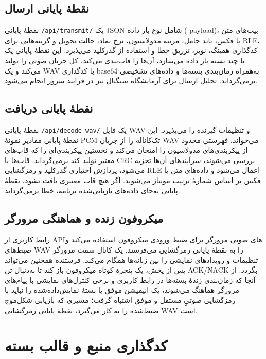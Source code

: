 \documentclass[12pt,a4paper]{article}
\providecommand{\lr}[1]{\foreignlanguage{english}{\begingroup\hyphenchar\font=-1 #1\endgroup}}
\newcommand{\code}[1]{\lr{\texttt{#1}}}
\begin{document}
\subsection{نقطۀ پایانی ارسال}
نقطۀ پایانی \code{/api/transmit/} یک \lr{JSON} شامل نوع بار داده (\lr{payload})، بیت‌های متن یا فکس، باند حامل، مرتبۀ مدولاسیون، نرخ نماد، حالت تحویل و گزینه‌هایی برای \lr{RLE}، کدگذاری همینگ، نویز، تزریق خطا و استفاده از گذرکلید می‌پذیرد. این نقطۀ پایانی یک یا چند بستۀ بار داده می‌سازد، آن‌ها را قاب‌بندی می‌کند، کل جریان صوتی را تولید می‌کند و یک \lr{WAV} با کدگذاری \lr{base64} به‌همراه زمان‌بندی بسته‌ها و داده‌های تشخیصی برمی‌گرداند. تحلیل ارسال برای آزمایشگاه سیگنال نیز در فرایند سرور انجام می‌شود.

\subsection{نقطۀ پایانی دریافت}
نقطۀ پایانی \code{/api/decode-wav/} یک فایل \lr{WAV} و تنظیمات گیرنده را می‌پذیرد. این نقطۀ پایانی مقادیر نمونۀ \lr{PCM} تک‌کاناله را از جریان \lr{WAV} می‌خواند، فهرستی محدود از پیکربندی‌های مدولاسیون را امتحان می‌کند و نخستین پیکربندی‌ای را که قاب‌های معتبر تولید کند برمی‌گرداند. قاب‌ها با \lr{CRC} بررسی می‌شوند، سرآیندهای آن‌ها تجزیه می‌شود، پردازش اختیاری گذرکلید و رمزگشایی \lr{RLE} اعمال می‌شود و داده‌های متن یا فکس بر اساس شمارۀ ترتیب مونتاژ می‌شوند. اگر هیچ قاب معتبری یافت نشود، نقطۀ پایانی به‌جای داده‌های بازیابی‌شدۀ برنامه، خطا برمی‌گرداند.

\subsection{میکروفون زنده و هماهنگی مرورگر}
رابط کاربری از \lr{API}‌های صوتی مرورگر برای ضبط ورودی میکروفون استفاده می‌کند و ضبط‌های \lr{WAV} را به نقطۀ پایانی رمزگشایی می‌فرستد. یک کانال سمت مرورگر تنظیمات و رویدادهای نمایشی را بین زبانه‌ها همگام می‌کند. فرستنده همچنین می‌تواند پس از پخش، یک پنجرۀ کوتاه میکروفون باز کند تا به‌دنبال تن \lr{ACK/NACK} بگردد. از آنجا که زمان‌بندی زندۀ بسته‌ها در رابط کاربری و برخی کنترل‌های نمایشی با پیام‌های مرورگر هماهنگ می‌شوند، یک انیمیشن موفق یا بستۀ نمایش‌داده‌شده را نباید با رمزگشایی صوتیِ مستقل و موفق اشتباه گرفت؛ مسیری که بازیابی شکل‌موج ضبط‌شده را به کار می‌گیرد، نقطۀ پایانی رمزگشایی \lr{WAV} است.

\section{کدگذاری منبع و قالب بسته}
\label{sec:source}
\end{document}

